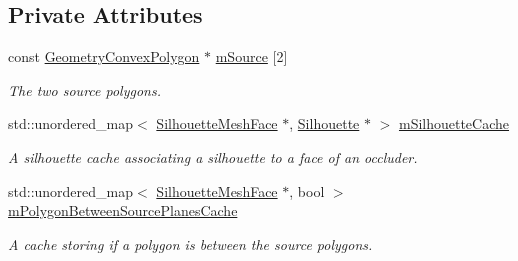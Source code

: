 \subsection*{Private Attributes}
\begin{DoxyCompactItemize}
\item 
\mbox{\label{classvisilib_1_1_silhouette_processor_a62decd2e0655912ba3b3e7c60c055efb}} 
const \mbox{\hyperlink{classvisilib_1_1_geometry_convex_polygon}{Geometry\+Convex\+Polygon}} $\ast$ \mbox{\hyperlink{classvisilib_1_1_silhouette_processor_a62decd2e0655912ba3b3e7c60c055efb}{m\+Source}} \mbox{[}2\mbox{]}
\begin{DoxyCompactList}\small\item\em The two source polygons. \end{DoxyCompactList}\item 
\mbox{\label{classvisilib_1_1_silhouette_processor_a8948918b7458f2ba371d244f32b9e301}} 
std\+::unordered\+\_\+map$<$ \mbox{\hyperlink{classvisilib_1_1_silhouette_mesh_face}{Silhouette\+Mesh\+Face}} $\ast$, \mbox{\hyperlink{classvisilib_1_1_silhouette}{Silhouette}} $\ast$ $>$ \mbox{\hyperlink{classvisilib_1_1_silhouette_processor_a8948918b7458f2ba371d244f32b9e301}{m\+Silhouette\+Cache}}
\begin{DoxyCompactList}\small\item\em A silhouette cache associating a silhouette to a face of an occluder. \end{DoxyCompactList}\item 
\mbox{\label{classvisilib_1_1_silhouette_processor_a8dca97de4e431858335a89e236f3b33b}} 
std\+::unordered\+\_\+map$<$ \mbox{\hyperlink{classvisilib_1_1_silhouette_mesh_face}{Silhouette\+Mesh\+Face}} $\ast$, bool $>$ \mbox{\hyperlink{classvisilib_1_1_silhouette_processor_a8dca97de4e431858335a89e236f3b33b}{m\+Polygon\+Between\+Source\+Planes\+Cache}}
\begin{DoxyCompactList}\small\item\em A cache storing if a polygon is between the source polygons. \end{DoxyCompactList}\item 
\mbox{\label{classvisilib_1_1_silhouette_processor_ae30799e77e708b67a60f8a7da98c8acf}} 

\end{DoxyCompactItemize}
